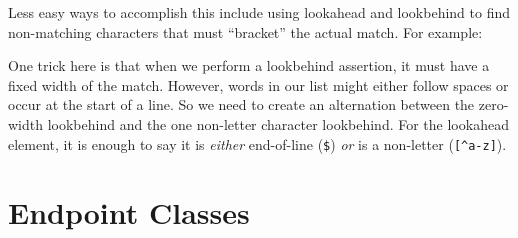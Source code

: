 \begin{Shaded}
\begin{Highlighting}[]
\OperatorTok{\textgreater{}\textgreater{}\textgreater{}}\OperatorTok{=}\NormalTok{(}\NormalTok{)}
\OperatorTok{\textgreater{}\textgreater{}\textgreater{}}
\NormalTok{[}\NormalTok{, }\NormalTok{, }\NormalTok{]}
\end{Highlighting}
\end{Shaded}

Less easy ways to accomplish this include using lookahead and lookbehind
to find non-matching characters that must ``bracket'' the actual match.
For example:

\begin{Shaded}
\begin{Highlighting}[]
\OperatorTok{\textgreater{}\textgreater{}\textgreater{}}\OperatorTok{=} \NormalTok{)}
\OperatorTok{\textgreater{}\textgreater{}\textgreater{}}
\NormalTok{[}\NormalTok{, }\NormalTok{, }\NormalTok{]}
\end{Highlighting}
\end{Shaded}

One trick here is that when we perform a lookbehind assertion, it must
have a fixed width of the match. However, words in our list might either
follow spaces or occur at the start of a line. So we need to create an
alternation between the zero-width lookbehind and the one non-letter
character lookbehind. For the lookahead element, it is enough to say it
is \emph{either} end-of-line (\texttt{\$}) \emph{or} is a non-letter
(\texttt{{[}\^{}a-z{]}}).

\newpage

\hypertarget{endpoint-classes}{%
\section{Endpoint Classes}\label{endpoint-classes}}

